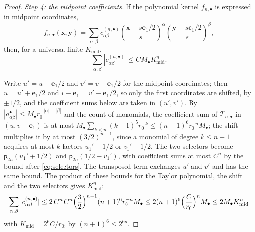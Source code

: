 \documentclass[11pt]{amsart}
\numberwithin{equation}{section}
\theoremstyle{definition}
\newcommand{\bx}{\mathbf x}
\newcommand{\by}{\mathbf y}
\newcommand{\eone}{\mathbf e_1}
\begin{document}
\begin{proof}
\smallskip
\emph{Step 4: the midpoint coefficients.} If the polynomial kernel
\(f_{n,\bullet}\) is expressed in midpoint coordinates,
\[
 f_{n,\bullet}(\bx,\by)
 =\sum_{\alpha,\beta}c_{\alpha\beta}^{(n,\bullet)}
 \left(\frac{\bx-s\eone/2}{s}\right)^\alpha
 \left(\frac{\by-s\eone/2}{s}\right)^\beta,
\]
then, for a universal finite \(K_{\mathrm{mid}}\),
\begin{equation}
 \sum_{\alpha,\beta}
 |c_{\alpha\beta}^{(n,\bullet)}|
 \le CM_\bullet K_{\mathrm{mid}}^n.
 \label{eq:coefficient-bound}
\end{equation}

Write \(u'=u-\eone/2\) and
\(v'=v-\eone/2\) for the midpoint coordinates; then \(u=u'+\eone/2\)
and \(v-\eone=v'-\eone/2\), so only the first coordinates are shifted,
by \(\pm1/2\), and the coefficient sums below are taken in
\((u',v')\). By \(|a^\bullet_{\alpha\beta}|\le M_\bullet
r_0^{-|\alpha|-|\beta|}\) and the count of monomials, the coefficient
sum of \(\mathcal T_{n,\bullet}\) in \((u,v-\eone)\) is at most
\(M_\bullet\sum_{k<n}(k+1)^5r_0^{-k}\le(n+1)^6r_0^{-n}M_\bullet\); the
shift multiplies it by at most \((3/2)^{n-1}\), since a monomial of
degree \(k\le n-1\) acquires at most \(k\) factors \(u_1'+1/2\) or
\(v_1'-1/2\). The two selectors become \(\mathsf p_{2n}(u_1'+1/2)\) and
\(\mathsf p_{2n}(1/2-v_1')\), with coefficient sums at most \(C^n\) by
the bound after \eqref{eq:selectors}. The transposed term exchanges
\(u'\) and \(v'\) and has the same bound. The product of these bounds
for the Taylor polynomial, the shift and the two selectors gives
\(K_{\mathrm{mid}}^n\):
\[
 \sum_{\alpha,\beta}|c^{(n,\bullet)}_{\alpha\beta}|
 \le2\,C^n\,C^n\Bigl(\frac32\Bigr)^{n-1}(n+1)^6r_0^{-n}M_\bullet
 \le2(n+1)^6\Bigl(\frac C{r_0}\Bigr)^nM_\bullet
 \le2M_\bullet K_{\mathrm{mid}}^n
\]
with \(K_{\mathrm{mid}}=2^6C/r_0\), by \((n+1)^6\le2^{6n}\).


\end{proof}
\end{document}
